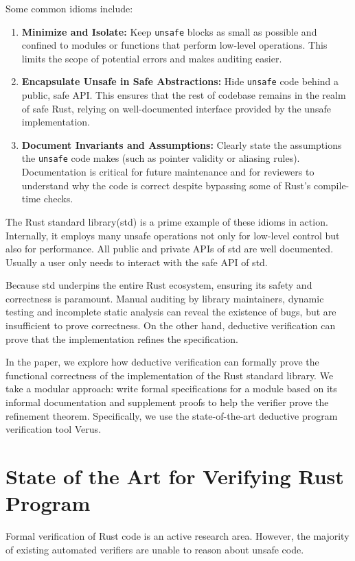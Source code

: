 \documentclass[conference]{IEEEtran}
\begin{document}
Some common idioms include:
\begin{enumerate}
    \item \textbf{Minimize and Isolate:} Keep \texttt{unsafe} blocks as small as possible and confined to modules or functions that perform low-level operations. This limits the scope of potential errors and makes auditing easier.
    \item \textbf{Encapsulate Unsafe in Safe Abstractions:} Hide \texttt{unsafe} code behind a public, safe API. This ensures that the rest of codebase remains in the realm of safe Rust, relying on well-documented interface provided by the unsafe implementation.
    \item \textbf{Document Invariants and Assumptions:} Clearly state the assumptions the \texttt{unsafe} code makes (such as pointer validity or aliasing rules). Documentation is critical for future maintenance and for reviewers to understand why the code is correct despite bypassing some of Rust’s compile-time checks.
\end{enumerate}


The Rust standard library(std) is a prime example of these idioms in action. Internally, it employs many unsafe operations not only for low-level control but also for performance. All public and private APIs of std are well documented. Usually a user only needs to interact with the safe API of std.  


Because std underpins the entire Rust ecosystem, ensuring its safety and correctness is paramount. Manual auditing by library maintainers, dynamic testing and incomplete static analysis can reveal the existence of bugs, but are insufficient to prove correctness. On the other hand, deductive verification can prove that the implementation refines the specification.           


In the paper, we explore how deductive verification can formally prove the functional correctness of the implementation of the Rust standard library. We take a modular approach: write formal specifications for a module based on its informal documentation and supplement proofs to help the verifier prove the refinement theorem. Specifically, we use the state-of-the-art deductive program verification tool Verus\cite{verus}. 
        
\section{State of the Art for Verifying Rust Program}
Formal verification of Rust code is an active research area. However, the majority of existing automated verifiers are unable to reason about unsafe code. 
\end{document}
